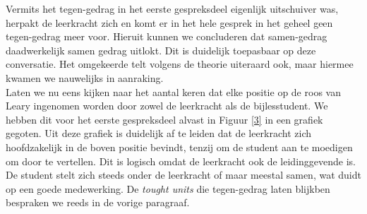 \documentclass[a4paper,12pt]{article}
\theoremstyle{definition}
\begin{document}
Vermits het tegen-gedrag in het eerste gespreksdeel eigenlijk uitschuiver was, 
herpakt de leerkracht zich en komt er in het hele gesprek in het geheel geen 
tegen-gedrag meer voor. Hieruit kunnen we concluderen dat samen-gedrag daadwerkelijk samen gedrag uitlokt. Dit is duidelijk 
toepasbaar op deze conversatie. Het omgekeerde telt volgens de theorie uiteraard 
ook, maar hiermee kwamen we nauwelijks in aanraking.\\

Laten we nu eens kijken naar het aantal keren dat elke positie op de roos van 
Leary ingenomen worden door zowel de leerkracht als de bijlesstudent. We hebben 
dit voor het eerste gespreksdeel alvast in Figuur \ref{3} in een grafiek gegoten. 
Uit deze grafiek is duidelijk af te leiden dat de leerkracht zich hoofdzakelijk 
in de boven positie bevindt, tenzij om de student aan te moedigen om door te 
vertellen. Dit is logisch omdat de leerkracht ook de leidinggevende is. De student stelt zich steeds onder
de leerkracht of maar meestal samen, wat duidt op een goede medewerking. De \emph{tought units} 
die tegen-gedrag laten blijkben bespraken we reeds in de vorige paragraaf.\\
\end{document}
